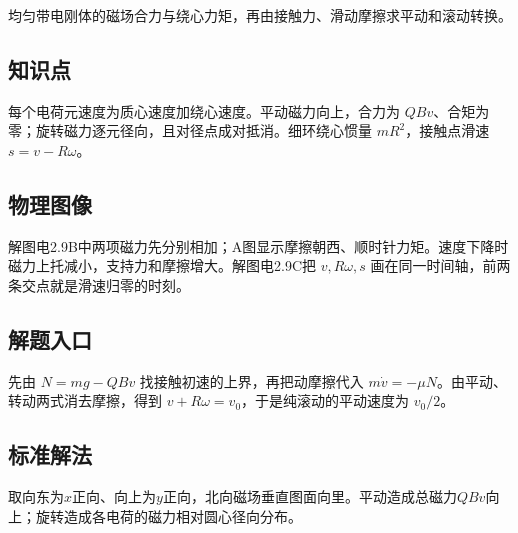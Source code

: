 \documentclass[UTF8,fontset=fandol,a4paper,11pt]{ctexart}
\begin{document}
均匀带电刚体的磁场合力与绕心力矩，再由接触力、滑动摩擦求平动和滚动转换。



\subsection*{知识点}

每个电荷元速度为质心速度加绕心速度。平动磁力向上，合力为 $QBv$、合矩为零；旋转磁力逐元径向，且对径点成对抵消。细环绕心惯量 $mR^2$，接触点滑速 $s=v-R\omega$。



\subsection*{物理图像}

解图电2.9B中两项磁力先分别相加；A图显示摩擦朝西、顺时针力矩。速度下降时磁力上托减小，支持力和摩擦增大。解图电2.9C把 $v,R\omega,s$ 画在同一时间轴，前两条交点就是滑速归零的时刻。



\subsection*{解题入口}

先由 $N=mg-QBv$ 找接触初速的上界，再把动摩擦代入 $m\dot v=-\mu N$。由平动、转动两式消去摩擦，得到 $v+R\omega=v_0$，于是纯滚动的平动速度为 $v_0/2$。


\subsection*{标准解法}

取向东为$x$正向、向上为$y$正向，北向磁场垂直图面向里。平动造成总磁力$QBv$向上；旋转造成各电荷的磁力相对圆心径向分布。
\end{document}
